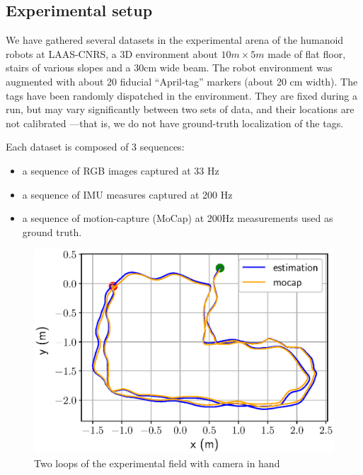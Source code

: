 \subsection{Experimental setup}
We have gathered several datasets in the experimental arena of the humanoid robots at LAAS-CNRS, a 3D environment about $10m \times 5m$ made of flat floor, stairs of various slopes and a 30cm wide beam.
The robot environment was augmented with about 20 fiducial ``April-tag'' markers (about 20 cm width).
The tags have been randomly dispatched in the environment.
They are fixed during a run, but may vary significantly between two sets of data, and their locations are not calibrated ---that is, we do not have ground-truth localization of the tags.

Each dataset is composed of 3 sequences:
\begin{itemize}
    \item a sequence of RGB images captured at 33 Hz
    \item a sequence of IMU measures captured at 200 Hz
    \item a sequence of motion-capture (MoCap) at 200Hz measurements used as ground truth.
\end{itemize}


\begin{figure}[t]
    \centering
    \includegraphics[scale=0.5]{figures/absolute/xy_loop_twice.eps}
    \caption{Two loops of the experimental field with camera in hand}
    \label{fig:xy_loop_twice}
\end{figure}

